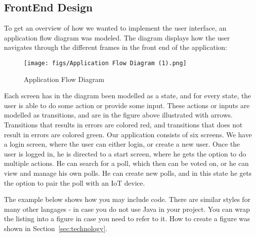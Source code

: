 \subsection{FrontEnd Design} 
To get an overview of how we wanted to implement the user interface, an application flow diagram was modeled. 
The diagram displays how the user navigates through the different frames in the front end of the application:

\begin{figure}[h]
  \centering
  \texttt{[image: figs/Application Flow Diagram (1).png]}
  \caption{Application Flow Diagram}
  \label{fig:appFlow}
\end{figure}

Each screen has in the diagram been modelled as a state, and for every state, the user is able to do some action or provide some input. 
These actions or inputs are modelled as transitions, and are in the figure above illustrated with arrows. Transitions that results in errors are 
colored red, and transitions that does not result in errors are colored green. Our application consists of six screens. We have a login screen, 
where the user can either login, or create a new user. Once the user is logged in, he is directed to a start screen, where he gets the option to 
do multiple actions. He can search for a poll, which then can be voted on, or he can view and manage his own polls. He can create new polls,
and in this state he gets the option to pair the poll with an IoT device. 

The example below shows how you may include code. There are similar
styles for many other langages - in case you do not use Java in your
project. You can wrap the listing into a figure in case you need to
refer to it. How to create a figure was shown in Section~\ref{sec:technology}.

